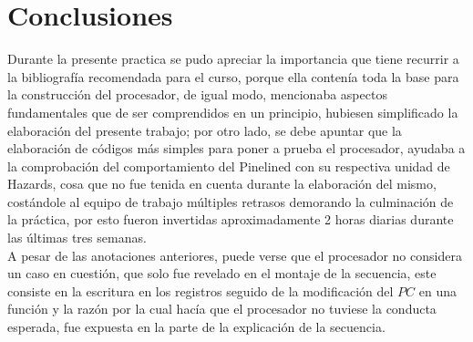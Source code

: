 \section*{Conclusiones} 
Durante la presente practica se pudo apreciar la importancia que tiene recurrir a la bibliografía recomendada para el curso, porque ella contenía toda la base para la construcción del procesador, de igual modo, mencionaba aspectos fundamentales que de ser comprendidos en un principio, hubiesen simplificado la elaboración del presente trabajo; por otro lado, se debe apuntar que la elaboración de códigos más simples para poner a prueba el procesador, ayudaba a la comprobación del comportamiento del Pinelined con su respectiva unidad de Hazards, cosa que no fue tenida en cuenta durante la elaboración del mismo, costándole al equipo de trabajo múltiples retrasos demorando la culminación de la práctica, por esto fueron invertidas aproximadamente 2 horas diarias durante las últimas tres semanas.\\
A pesar de las anotaciones anteriores, puede verse que el procesador no considera un caso en cuestión, que solo fue revelado en el montaje de la secuencia, este consiste en la escritura en los registros seguido de la modificación del $PC$ en una función y la razón por la cual hacía que el procesador no tuviese la conducta esperada, fue expuesta en la parte de la explicación de la secuencia.\\





